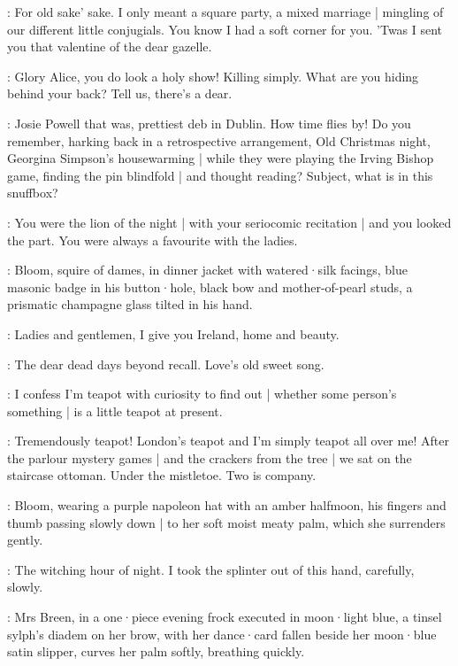 \Bloom:
For old sake' sake.
I only meant a square party,
a mixed marriage |
mingling of our different little conjugials.
You know I had a soft corner for you.
'Twas I sent you that valentine of the dear gazelle.

\MrsBreen:
Glory Alice,
you do look a holy show!
Killing simply.
What are you hiding behind your back?
Tell us,
there's a dear.

\Bloom:
Josie Powell that was,
prettiest deb in Dublin.
How time flies by!
Do you remember,
harking back in a retrospective arrangement,
Old Christmas night,
Georgina Simpson's housewarming |
while they were playing the Irving Bishop game,
finding the pin blindfold |
and thought reading?
Subject,
what is in this snuffbox?

\MrsBreen:
You were the lion of the night |
with your seriocomic recitation |
and you looked the part.
You were always a favourite with the ladies.

:
Bloom,
squire of dames,
in dinner jacket with watered·silk facings,
blue masonic badge in his button·hole,
black bow and mother-of-pearl studs,
a prismatic champagne glass tilted in his hand.

\Bloom:
Ladies and gentlemen,
I give you Ireland,
home and beauty.

\MrsBreen:
The dear dead days beyond recall.
Love's old sweet song.

\Bloom:
I confess I'm teapot with curiosity to find out |
whether some person's something |
is a little teapot at present.

\MrsBreen:
Tremendously teapot!
London's teapot and I'm simply teapot all over me!
After the parlour mystery games |
and the crackers from the tree |
we sat on the staircase ottoman.
Under the mistletoe.
Two is company.

:
Bloom,
wearing a purple napoleon hat with an amber halfmoon,
his fingers and thumb passing slowly down |
to her soft moist meaty palm,
which she surrenders gently.

\Bloom:
The witching hour of night.
I took the splinter out of this hand,
carefully,
slowly.

:
Mrs Breen,
in a one·piece evening frock executed in moon·light blue,
a tinsel sylph's diadem on her brow,
with her dance·card fallen beside her moon·blue satin slipper,
curves her palm softly,
breathing quickly.

